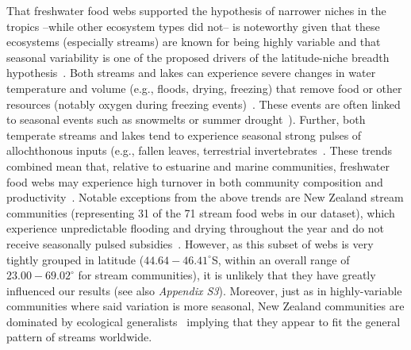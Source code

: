 \documentclass[12pt]{article}
\begin{document}
  That freshwater food webs supported the hypothesis of narrower niches in the
  tropics --while other ecosystem types did not-- is noteworthy given that
  these ecosystems (especially streams) are known for being highly variable
  and that seasonal variability is one of the proposed drivers of the
  latitude-niche breadth hypothesis~\cite{Vazquez2004}. Both streams and lakes
  can experience severe changes in water temperature and volume (e.g., floods,
  drying, freezing) that remove food or other resources (notably oxygen during
  freezing events)~\cite{Winterbourn1997,Meding2001}. These events are often
  linked to seasonal events such as snowmelts or summer
  drought~\cite{Winterbourn1997}). Further, both temperate streams and lakes
  tend to experience seasonal strong pulses of allochthonous inputs (e.g.,
  fallen leaves, terrestrial
  invertebrates~\cite{Nakano2001,Lennon2004,Zeng2008}. These trends combined
  mean that, relative to estuarine and marine communities, freshwater food 
  webs may experience high turnover in both community composition and 
  productivity~\cite{Tilzer1988,Magalhaes1993,Baird1989}. Notable exceptions from the above
  trends are New Zealand stream communities (representing 31 of the 71 stream
  food webs in our dataset), which experience unpredictable flooding and
  drying throughout the year and do not receive seasonally pulsed
  subsidies~\cite{Winterbourn1997,Winterbourn1981}. However, as this subset of
  webs is very tightly grouped in latitude ($44.64-46.41^{\circ}$S, within an
  overall range of $23.00-69.02^{\circ}$ for stream communities), it is unlikely that they have greatly
  influenced our results (see also \emph{Appendix S3}). Moreover, just as in
  highly-variable communities where said variation is more seasonal, New
  Zealand communities are dominated by ecological
  generalists~\cite{Winterbourn1997,Winterbourn1981} implying that they appear
  to fit the general pattern of streams worldwide.
\end{document}
